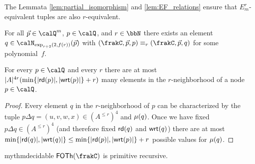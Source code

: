 The Lemmata \ref{lem:partial_isomorphism} and \ref{lem:EF_relations} ensure that $E^r_m$-equivalent tuples are also $r$-equivalent.

\begin{corollary}\label{cor:equivalence}
	For all $\vec{p}\in \Qx^m$, $p\in \Qx$, and $r\in\bbN$ there exists an element $q\in \calN_{\exp_{r+2}(2,f(r))}(\vec{p})$ with $(\frakC, \vec{p}, p) \equiv_r (\frakC,\vec{p}, q)$ for some polynomial~$f$.
\end{corollary}





\begin{lemma}\label{lem:neighborhood_size}
	For every $p\in \Qx$ and every $r$ there are at most $|A|^{4r} (\min\{|\mathsf{rd}(p)|, |\mathsf{wrt}(p)|\} + r)$ many elements in the $r$-neighborhood of a node $p\in \Qx$. 
\end{lemma}
\begin{proof}
	Every element $q$ in the $r$-neighborhood of $p$ can be characterized by the tuple $p\Delta q = (u,v, w, x)\in (A^{\leq r})^4$ and $\mu(q)$. Once we have fixed  
	$p\Delta q \in (A^{\leq r})^4$ (and therefore fixed $\mathsf{rd}(q)$ and $\mathsf{wrt}(q)$) there are at most $\min\{ |\mathsf{rd}(q)|, |\mathsf{wrt}(q)| \} \leq \min\{ |\mathsf{rd}(p)|, |\mathsf{wrt}(p)| \} + r$ possible values for $\mu(q)$.
\end{proof}

\begin{restatable}{mythm}{decidable}
	$\FOTh{\frakC}$ is primitive recursive.
\end{restatable}
